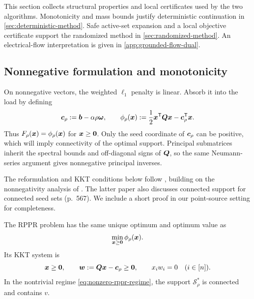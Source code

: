 This section collects structural properties and local certificates used by
the two algorithms.
Monotonicity and mass bounds justify deterministic continuation in
\cref{sec:deterministic-method}. Safe active-set expansion and a local
objective certificate support the randomized method in
\cref{sec:randomized-method}. An electrical-flow interpretation is given
in \cref{app:grounded-flow-dual}.

\subsection{Nonnegative formulation and monotonicity}

On nonnegative vectors, the weighted $\ell_1$ penalty is linear. Absorb it
into the load by defining
\begin{equation}
 \bm{c}_\rho:=\bm{b}-\alpha\rho\bm{\omega},
 \qquad
 \phi_\rho(\bm{x}):=\frac12\bm{x}^{\mathsf{T}}\bm{Q}\bm{x}-\bm{c}_\rho^{\mathsf{T}}\bm{x}.
 \label{eq:shifted-obstacle}
\end{equation}
Thus $F_\rho(\bm{x})=\phi_\rho(\bm{x})$ for $\bm{x}\geq\bm{0}$.
Only the seed coordinate of $\bm{c}_\rho$ can be positive, which will imply
connectivity of the optimal support.
Principal submatrices inherit the spectral bounds and off-diagonal signs
of $\bm{Q}$, so the same Neumann-series argument gives nonnegative principal
inverses.

The reformulation and KKT conditions below follow
\citet[Section~2]{martinezrubio2023accelerated}, building on the
nonnegativity analysis of \citet[Theorem~1]{fountoulakis2019variational}.
The latter paper also discusses connected support for connected seed sets
(p.~567). We include a short proof in our point-source setting for
completeness.

\begin{lemma}
\label{thm:obstacle-reduction}
The RPPR problem has the same unique optimum and optimum value as
\begin{equation}
 \min_{\bm{x}\geq\bm{0}}\phi_\rho(\bm{x}).
 \label{eq:obstacle-problem}
\end{equation}
Its KKT system is
\begin{equation}
 \bm{x}\geq\bm{0},
 \qquad
 \bm{w}:=\bm{Q}\bm{x}-\bm{c}_\rho\geq\bm{0},
 \qquad
 x_iw_i=0\quad(i\in[n]).
 \label{eq:obstacle-kkt}
\end{equation}
In the nontrivial regime \eqref{eq:nonzero-rppr-regime}, the support
$\mathcal S_\rho^*$ is connected and contains $v$.
\end{lemma}

